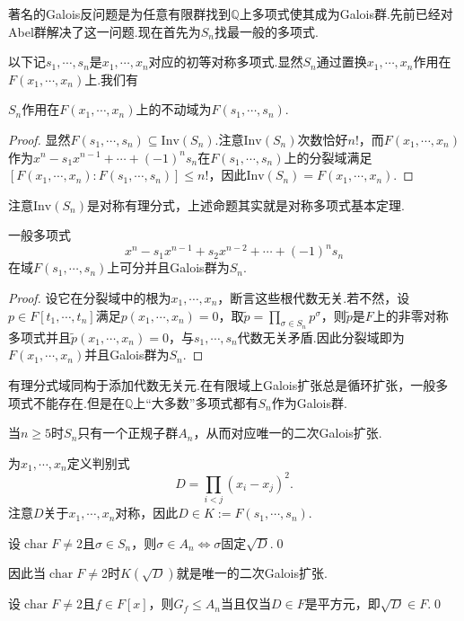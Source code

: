 著名的Galois反问题是为任意有限群找到$\mathbb{Q}$上多项式使其成为Galois群.先前已经对Abel群解决了这一问题.现在首先为$S_n$找最一般的多项式.

以下记$s_1,\cdots,s_n$是$x_1,\cdots,x_n$对应的初等对称多项式.显然$S_n$通过置换$x_1,\cdots,x_n$作用在$F(x_1,\cdots,x_n)$上.我们有
\begin{prop}
    $S_n$作用在$F(x_1,\cdots,x_n)$上的不动域为$F(s_1,\cdots,s_n)$.
\end{prop}
\begin{proof}
    显然$F(s_1,\cdots,s_n)\subseteq\mathrm{Inv}(S_n)$.注意$\mathrm{Inv}(S_n)$次数恰好$n!$，而$F(x_1,\cdots,x_n)$作为$x^n-s_1x^{n-1}+\cdots+(-1)^ns_n$在$F(s_1,\cdots,s_n)$上的分裂域满足$[F(x_1,\cdots,x_n):F(s_1,\cdots,s_n)]\le n!$，因此$\mathrm{Inv}(S_n)=F(x_1,\cdots,x_n)$.
\end{proof}
\begin{remark}
    注意$\mathrm{Inv}(S_n)$是对称有理分式，上述命题其实就是对称多项式基本定理.
\end{remark}
\begin{thm}
    一般多项式
    \[
        x^n-s_1x^{n-1}+s_2x^{n-2}+\cdots+(-1)^ns_n
    \]
    在域$F(s_1,\cdots,s_n)$上可分并且Galois群为$S_n$.
\end{thm}
\begin{proof}
    设它在分裂域中的根为$x_1,\cdots,x_n$，断言这些根代数无关.若不然，设$p\in F[t_1,\cdots,t_n]$满足$p(x_1,\cdots,x_n)=0$，取$\tilde p=\prod_{\sigma\in S_n}p^\sigma$，则$\tilde p$是$F$上的非零对称多项式并且$\tilde p(x_1,\cdots,x_n)=0$，与$s_1,\cdots,s_n$代数无关矛盾.因此分裂域即为$F(x_1,\cdots,x_n)$并且Galois群为$S_n$.
\end{proof}
\begin{remark}
    有理分式域同构于添加代数无关元.在有限域上Galois扩张总是循环扩张，一般多项式不能存在.但是在$\mathbb{Q}$上“大多数”多项式都有$S_n$作为Galois群.
\end{remark}

当$n\ge 5$时$S_n$只有一个正规子群$A_n$，从而对应唯一的二次Galois扩张.

为$x_1,\cdots,x_n$定义{\heiti 判别式}
\[
    D=\prod_{i<j}(x_i-x_j)^2.
\]
注意$D$关于$x_1,\cdots,x_n$对称，因此$D\in K:=F(s_1,\cdots,s_n)$.

\begin{lemma*}
    设$\operatorname*{char}F\ne 2$且$\sigma\in S_n$，则$\sigma\in A_n\iff\sigma$固定$\sqrt D$.\qed
\end{lemma*}

因此当$\operatorname*{char}F\ne 2$时$K(\sqrt D)$就是唯一的二次Galois扩张.
\begin{cor*}
    设$\operatorname*{char}F\ne 2$且$f\in F[x]$，则$G_f\le A_n$当且仅当$D\in F$是平方元，即$\sqrt D\in F$.\qed
\end{cor*}

